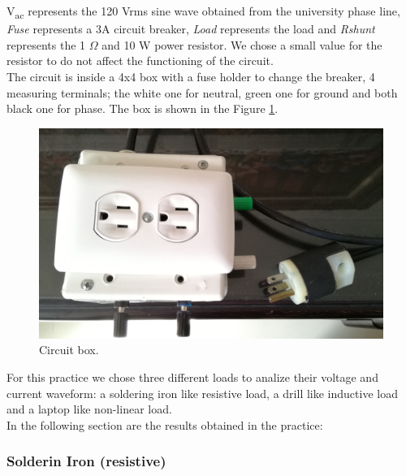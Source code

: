\documentclass[journal]{IEEEtran}
\begin{document}
V\textsubscript{ac} represents the 120 Vrms sine wave obtained from 
the university phase line, \textit{Fuse} represents a 3A circuit 
breaker, \textit{Load} represents the load and \textit{Rshunt} 
represents the 1 $\Omega$ and 10 W 
power resistor. We chose a small value for the resistor to do not 
affect the functioning of the circuit. \\

The circuit is inside a 4x4 box with a fuse holder to change the 
breaker, 4 measuring terminals; the white one for neutral, green one 
for ground and  both black one for phase. The box is shown in the 
Figure \ref{circuit_box}. \\

\begin{figure}[h]
\centering
\includegraphics[clip,width=0.8\columnwidth]{circuit_box.png}
\caption{Circuit box.}
\label{circuit_box}
\end{figure}

For this practice we chose three different loads to analize their 
voltage and current waveform: a soldering iron 
like resistive load, a drill like inductive load and a laptop 
like non-linear load. \\

In the following section are the results obtained in the practice: \\

\subsubsection{Solderin Iron (resistive)}
\end{document}
